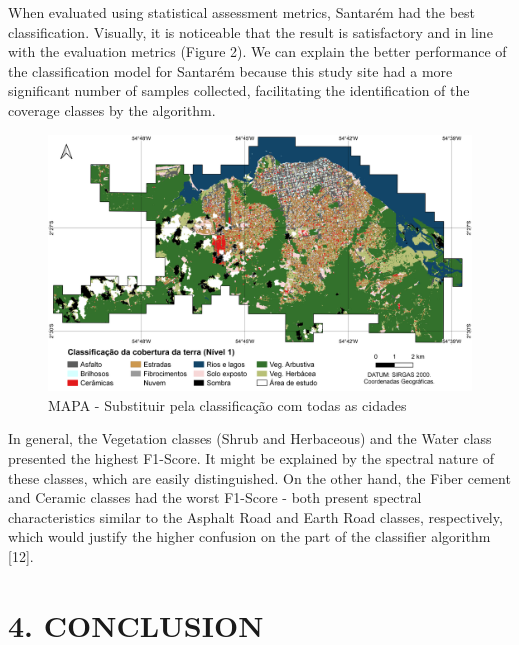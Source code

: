 \documentclass[preprint, 3p,
authoryear]{elsarticle} %
\begin{document}
When evaluated using statistical assessment metrics, Santarém had the
best classification. Visually, it is noticeable that the result is
satisfactory and in line with the evaluation metrics (Figure 2). We can
explain the better performance of the classification model for Santarém
because this study site had a more significant number of samples
collected, facilitating the identification of the coverage classes by
the algorithm.

\begin{figure}
\centering
\includegraphics{images/Classificação Cobertura (Nível 1).png}
\caption{MAPA - Substituir pela classificação com todas as cidades}
\end{figure}

In general, the Vegetation classes (Shrub and Herbaceous) and the Water
class presented the highest F1-Score. It might be explained by the
spectral nature of these classes, which are easily distinguished. On the
other hand, the Fiber cement and Ceramic classes had the worst F1-Score
- both present spectral characteristics similar to the Asphalt Road and
Earth Road classes, respectively, which would justify the higher
confusion on the part of the classifier algorithm {[}12{]}.

\hypertarget{conclusion}{%
\section*{4. CONCLUSION}\label{conclusion}}
\end{document}
